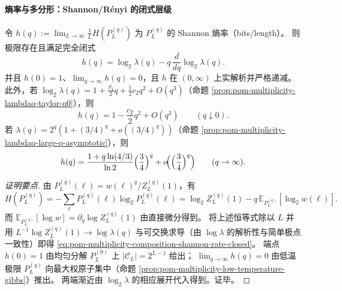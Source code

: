 \paragraph{熵率与多分形：Shannon/Rényi 的闭式层级}
\begin{proposition}\label{prop:pom-multiplicity-composition-shannon-entropy-rate-generalq}
令
\(
h(q):=\lim_{L\to\infty}\frac{1}{L}H(P_L^{(q)})
\)
为 \(P_L^{(q)}\) 的 Shannon 熵率（bits/length）。
则极限存在且满足完全闭式
\begin{equation}\label{eq:pom-multiplicity-composition-shannon-rate-closed}
\boxed{\;
h(q)=\log_2\lambda(q)-q\,\frac{d}{dq}\log_2\lambda(q).\;}
\end{equation}
并且 \(h(0)=1\)、\(\lim_{q\to\infty}h(q)=0\)，且 \(h\) 在 \((0,\infty)\) 上实解析并严格递减。
此外，若 \(\log_2\lambda(q)=1+\frac{S_1}{2}q+\frac12 c_2 q^2+O(q^3)\)（命题 \ref{prop:pom-multiplicity-lambdaq-taylor-q0}），则
\[
h(q)=1-\frac{c_2}{2}q^2+O(q^3)\qquad(q\downarrow 0).
\]
若 \(\lambda(q)=2^q(1+(3/4)^q+o((3/4)^q))\)（命题 \ref{prop:pom-multiplicity-lambdaq-large-q-asymptotic}），则
\[
h(q)=\frac{1+q\ln(4/3)}{\ln 2}\Bigl(\frac34\Bigr)^{q}+o\!\Bigl(\Bigl(\frac34\Bigr)^{q}\Bigr)\qquad(q\to\infty).
\]
\end{proposition}
\begin{proof}[证明要点]
由 \(P_L^{(q)}(\boldsymbol{\ell})=w(\boldsymbol{\ell})^q/Z_L^{(q)}(1)\)，有
\[
H(P_L^{(q)})
=-\sum_{\boldsymbol{\ell}}P_L^{(q)}(\boldsymbol{\ell})\log_2 P_L^{(q)}(\boldsymbol{\ell})
=\log_2 Z_L^{(q)}(1)-q\,\mathbb{E}_{P_L^{(q)}}[\log_2 w(\boldsymbol{\ell})].
\]
而
\(
\mathbb{E}_{P_L^{(q)}}[\log w]=\partial_q \log Z_L^{(q)}(1)
\)
由直接微分得到。
将上述恒等式除以 \(L\) 并用
\(
L^{-1}\log Z_L^{(q)}(1)\to \log\lambda(q)
\)
与可交换求导（由 \(\log\lambda\) 的解析性与简单极点一致性）即得 \eqref{eq:pom-multiplicity-composition-shannon-rate-closed}。
端点 \(h(0)=1\) 由均匀分解 \(P_L^{(0)}\) 上 \(|\mathcal{C}_L|=2^{L-1}\) 给出；
\(\lim_{q\to\infty}h(q)=0\) 由低温极限 \(P_L^{(q)}\) 向最大权原子集中（命题 \ref{prop:pom-multiplicity-low-temperature-gibbs}）推出。
两端渐近由 \(\log_2\lambda\) 的相应展开代入得到。证毕。
\end{proof}

